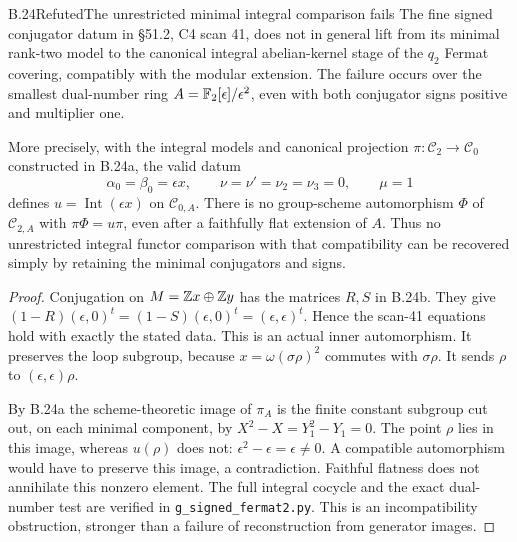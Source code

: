 \begin{statement}{B.24}{Refuted}{The unrestricted minimal integral comparison fails}
The fine signed conjugator datum in \S51.2, C4 scan 41, does not
in general lift from its minimal rank-two model to the canonical
integral abelian-kernel stage of the $q_2$ Fermat covering, compatibly
with the modular extension.  The failure occurs over the smallest
dual-number ring $A=\mathbb F_2[\epsilon]/\epsilon^2$, even with both
conjugator signs positive and multiplier one.

More precisely, with the integral models and canonical projection
$\pi:\mathscr C_2\to\mathscr C_0$ constructed in B.24a, the valid
datum
\[
 \alpha_0=\beta_0=\epsilon x,\qquad
 \nu=\nu'=\nu_2=\nu_3=0,\qquad\mu=1
\]
defines $u=\operatorname{Int}(\epsilon x)$ on $\mathscr C_{0,A}$.
There is no group-scheme automorphism $\Phi$ of $\mathscr C_{2,A}$
with $\pi\Phi=u\pi$, even after a faithfully flat extension of $A$.
Thus no unrestricted integral functor comparison with that compatibility
can be recovered simply by retaining the minimal conjugators and signs.
\end{statement}
\begin{proof}
Conjugation on $M=\mathbb Z x\oplus\mathbb Z y$ has the matrices $R,S$ in B.24b.
They give
$(1-R)(\epsilon,0)^t=(1-S)(\epsilon,0)^t=(\epsilon,\epsilon)^t$.
Hence the scan-41 equations hold with exactly the stated data.
This is an actual inner automorphism.  It preserves the loop subgroup,
because $x=\omega(\sigma\rho)^2$ commutes with $\sigma\rho$.
It sends $\rho$ to $(\epsilon,\epsilon)\rho$.

By B.24a the scheme-theoretic image of $\pi_A$ is the finite constant
subgroup cut out, on each minimal component, by $X^2-X=Y_1^2-Y_1=0$.
The point $\rho$ lies in this image, whereas $u(\rho)$ does not:
$\epsilon^2-\epsilon=\epsilon\ne0$.  A compatible automorphism
would have to preserve this image, a contradiction.  Faithful flatness
does not annihilate this nonzero element.  The full integral cocycle and
the exact dual-number test are verified in
\texttt{g\_signed\_fermat2.py}.  This is an incompatibility obstruction,
stronger than a failure of reconstruction from generator images.
\end{proof}




